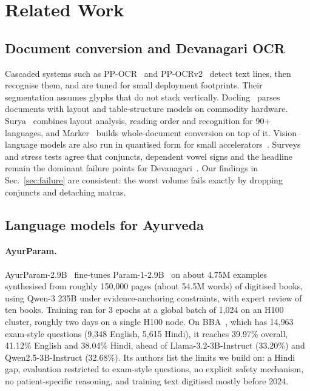 \documentclass[10pt,twocolumn,letterpaper]{article}
\begin{document}
\section{Related Work}
\label{sec:related}

\subsection{Document conversion and Devanagari OCR}

Cascaded systems such as PP-OCR~\cite{ppocr} and PP-OCRv2~\cite{ppocrv2} detect
text lines, then recognise them, and are tuned for small deployment footprints.
Their segmentation assumes glyphs that do not stack vertically.
Docling~\cite{docling,doclingtr} parses documents with layout and table-structure
models on commodity hardware. Surya~\cite{surya} combines layout analysis,
reading order and recognition for 90+ languages, and Marker~\cite{marker} builds
whole-document conversion on top of it. Vision--language models are also run in
quantised form for small accelerators~\cite{lfm2vl}. Surveys and stress tests
agree that conjuncts, dependent vowel signs and the headline remain the dominant
failure points for Devanagari~\cite{devaocr,devavlm,sanskritdl}. Our findings in
Sec.~\ref{sec:failure} are consistent: the worst volume fails exactly by dropping
conjuncts and detaching matras.

\subsection{Language models for Ayurveda}

\paragraph{AyurParam.}
AyurParam-2.9B~\cite{ayurparam} fine-tunes Param-1-2.9B~\cite{param1} on about
4.75M examples synthesised from roughly 150{,}000 pages (about 54.5M words) of
digitised books, using Qwen-3 235B under evidence-anchoring constraints, with
expert review of ten books. Training ran for 3 epochs at a global batch of 1{,}024
on an H100 cluster, roughly two days on a single H100 node. On
BBA~\cite{bhashabench,bhashabenchdata}, which has 14{,}963 exam-style questions
(9{,}348 English, 5{,}615 Hindi), it reaches 39.97\% overall, 41.12\% English and
38.04\% Hindi, ahead of Llama-3.2-3B-Instruct (33.20\%) and Qwen2.5-3B-Instruct
(32.68\%). Its authors list the limits we build on: a Hindi gap, evaluation
restricted to exam-style questions, no explicit safety mechanism, no
patient-specific reasoning, and training text digitised mostly before 2024.
\end{document}

